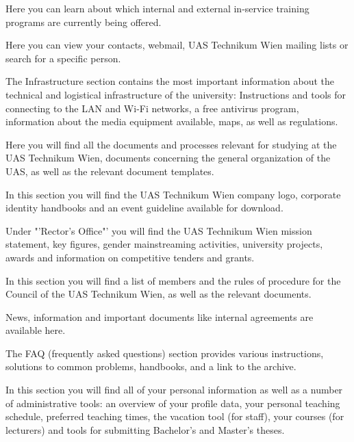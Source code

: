 Here you can learn about which internal and external in-service training programs are currently being offered.

Here you can view your contacts, webmail, UAS Technikum Wien mailing lists or search for a specific person.

The Infrastructure section contains the most important information about the technical and logistical infrastructure of the university:
Instructions and tools for connecting to the LAN and Wi-Fi networks, a free antivirus program, information about the media equipment available, maps, as well as regulations.

Here you will find all the documents and processes relevant for studying at the UAS Technikum Wien, documents concerning the general organization of the UAS, as well as the relevant document templates.

In this section you will find the UAS Technikum Wien company logo, corporate identity handbooks and an event guideline available for download.

Under "'Rector's Office"' you will find the UAS Technikum Wien mission statement, key figures, gender mainstreaming activities, university projects, awards and information on competitive tenders and grants.

	In this section you will find a list of members and the rules of procedure for the Council of the UAS Technikum Wien, as well as the relevant documents.

News, information and important documents like internal agreements are available here.

The FAQ (frequently asked questions) section provides various instructions, solutions to common problems, handbooks, and a link to the archive.

In this section you will find all of your personal information as well as a number of administrative tools:
an overview of your profile data, your personal teaching schedule, preferred teaching times, the vacation tool (for staff), your courses (for lecturers) and tools for submitting Bachelor's and Master's theses.